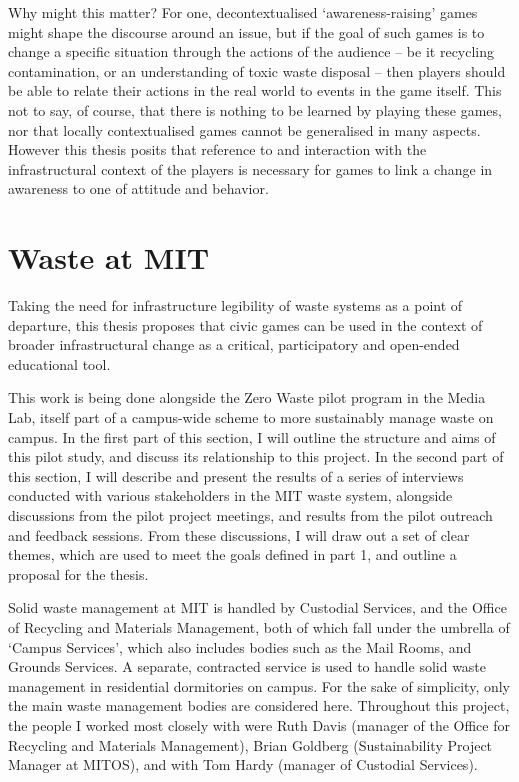 \documentclass[nofonts,nols,justified,nobib]{tufte-book}
\begin{document}
Why might this matter? For one, decontextualised `awareness-raising' games might shape the discourse around an issue, but if the goal of such games is to change a specific situation through the actions of the audience -- be it recycling contamination, or an understanding of toxic waste disposal -- then players should be able to relate their actions in the real world to events in the game itself. This not to say, of course, that there is nothing to be learned by playing these games, nor that locally contextualised games cannot be generalised in many aspects. However this thesis posits that reference to and interaction with the infrastructural context of the players is necessary for games to link a change in awareness to one of attitude and behavior.



\chapter{Waste at MIT}

Taking the need for infrastructure legibility of waste systems as a point of departure, this thesis proposes that civic games can be used in the context of broader infrastructural change as a critical, participatory and open-ended educational tool.

This work is being done alongside the Zero Waste pilot program in the Media Lab, itself part of a campus-wide scheme to more sustainably manage waste on campus. In the first part of this section, I will outline the structure and aims of this pilot study, and discuss its relationship to this project. In the second part of this section, I will describe and present the results of a series of interviews conducted with various stakeholders in the MIT waste system, alongside discussions from the pilot project meetings, and results from the pilot outreach and feedback sessions. From these discussions, I will draw out a set of clear themes, which are used to meet the goals defined in part 1, and outline a proposal for the thesis.

Solid waste management at MIT is handled by Custodial Services, and the Office of Recycling and Materials Management, both of which fall under the umbrella of `Campus Services', which also includes bodies such as the Mail Rooms, and Grounds Services. A separate, contracted service is used to handle solid waste management in residential dormitories on campus. For the sake of simplicity, only the main waste management bodies are considered here. Throughout this project, the people I worked most closely with were Ruth Davis (manager of the Office for Recycling and Materials Management), Brian Goldberg (Sustainability Project Manager at MITOS), and with Tom Hardy (manager of Custodial Services).
\end{document}
